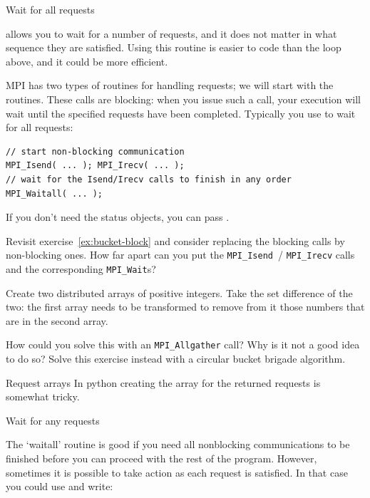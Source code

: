  {Wait for all requests}
  
 allows you to wait for a number of
requests, and it does not matter in what sequence they are
satisfied. Using this routine is easier to code than the loop above,
and it could be more efficient.


MPI has two types of routines for handling requests; we will start
with the  routines. These
calls are blocking: when you issue
such a call, your execution will wait until the specified requests
have been completed.
Typically you use
to wait for all requests:
\begin{lstlisting}
// start non-blocking communication
MPI_Isend( ... ); MPI_Irecv( ... );
// wait for the Isend/Irecv calls to finish in any order
MPI_Waitall( ... );
\end{lstlisting}

If you don't need the status objects, you can pass
.

\begin{exercise}
  \label{ex:bucket-nonblock}
  Revisit exercise~\ref{ex:bucket-block} and consider replacing the
  blocking calls by non-blocking ones. How far apart can you put the
  \lstinline{MPI_Isend}~/ \lstinline{MPI_Irecv} calls and the
  corresponding \lstinline{MPI_Wait}s?
\end{exercise}

\begin{exercise}
  \label{ex:setdiff}
  Create two distributed arrays of positive integers.
  Take the set difference of the two:
  the first array needs to be transformed to remove from it those numbers
  that are in the second array.

  How could you solve this with an \lstinline+MPI_Allgather+ call?
  Why is it not a good idea to do so?
  Solve this exercise instead with a circular bucket brigade algorithm.
\end{exercise}

\begin{pythonnote}{Request arrays}
  In python creating the array for the returned requests is somewhat
  tricky.
\end{pythonnote}

 {Wait for any requests}

The `waitall' routine is good if you need all nonblocking
communications to be finished before you can proceed with the rest of
the program. However, sometimes it is possible to take action as each
request is satisfied. In that case you could use
 and write:

